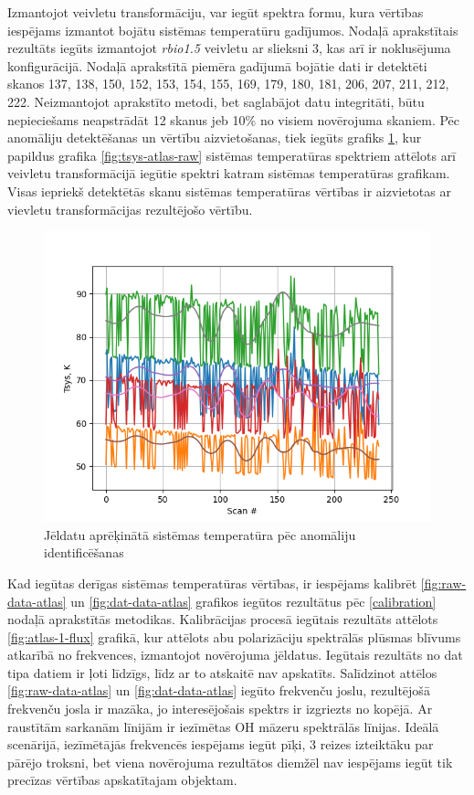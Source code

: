 Izmantojot veivletu transformāciju, var iegūt spektra formu, kura vērtības iespējams izmantot bojātu sistēmas temperatūru gadījumos. Nodaļā aprakstītais rezultāts iegūts izmantojot \textit{rbio1.5} veivletu ar slieksni 3, kas arī ir noklusējuma konfigurācijā. Nodaļā aprakstītā piemēra gadījumā bojātie dati ir detektēti skanos 137, 138, 150, 152, 153, 154, 155, 169, 179, 180, 181, 206, 207, 211, 212, 222. Neizmantojot aprakstīto metodi, bet saglabājot datu integritāti, būtu nepieciešams neapstrādāt 12 skanus jeb 10\% no visiem novērojuma skaniem. Pēc anomāliju detektēšanas un vērtību aizvietošanas, tiek iegūts grafiks \ref{fig:tsys-atlas-modified}, kur papildus grafika \ref{fig:tsys-atlas-raw} sistēmas temperatūras spektriem attēlots arī veivletu transformācijā iegūtie spektri katram sistēmas temperatūras grafikam. Visas iepriekš detektētās skanu sistēmas temperatūras vērtības ir aizvietotas ar vievletu transformācijas rezultējošo vērtību.


\begin{figure}[H]

\centering
\includegraphics[width=\textwidth]{images/created/atlas-r-f1666-ir-1-tsys-edited.png}
\caption{Jēldatu aprēķinātā sistēmas temperatūra pēc anomāliju identificēšanas}
\label{fig:tsys-atlas-modified}
\end{figure}

Kad iegūtas derīgas sistēmas temperatūras vērtības, ir iespējams kalibrēt \ref{fig:raw-data-atlas} un \ref{fig:dat-data-atlas} grafikos iegūtos rezultātus pēc \ref{calibration} nodaļā aprakstītās metodikas. Kalibrācijas procesā iegūtais rezultāts attēlots \ref{fig:atlas-1-flux} grafikā, kur attēlots abu polarizāciju spektrālās plūsmas blīvums atkarībā no frekvences, izmantojot novērojuma jēldatus. Iegūtais rezultāts no dat tipa datiem ir ļoti līdzīgs, līdz ar to atskaitē nav apskatīts. Salīdzinot attēlos \ref{fig:raw-data-atlas} un \ref{fig:dat-data-atlas} iegūto frekvenču joslu, rezultējošā frekvenču josla ir mazāka, jo interesējošais spektrs ir izgriezts no kopējā. Ar raustītām sarkanām līnijām ir iezīmētas OH māzeru spektrālās līnijas. Ideālā scenārijā, iezīmētājās frekvencēs iespējams iegūt pīķi, 3 reizes izteiktāku par pārējo troksni, bet viena novērojuma rezultātos diemžēl nav iespējams iegūt tik precīzas vērtības apskatītajam objektam.

